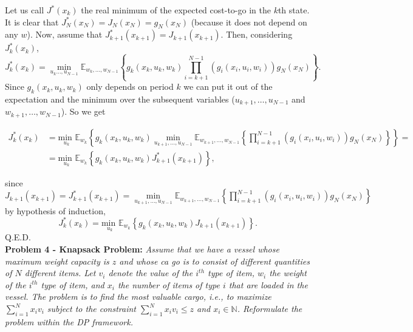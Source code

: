 \documentclass[11pt, english]{article}
\begin{document}
Let us call $J^*(x_k)$ the real minimum of the expected cost-to-go in the $k$th state. It is clear that $J_N^*(x_N)=J_N(x_N)=g_N(x_N)$ (because it does not depend on any $w$). Now, assume that $J_{k+1}^*(x_{k+1})=J_{k+1}(x_{k+1})$. Then, considering $J_k^*(x_k)$,
$$J_k^*(x_k)=\underset{u_{k}\dots, u_{N-1}}{\min}\mathbb{E}_{w_{k},\dots,w_{N-1}}\left\{g_k(x_k,u_k,w_k)\prod\limits_{i=k+1}^{N-1}
\left(g_i(x_i,u_i,w_i)\right)g_N(x_N)\right\}.$$
Since $g_k(x_k,u_k,w_k)$ only depends on period $k$ we can put it out of the expectation and the minimum over the subsequent variables ($u_{k+1},\dots,u_{N-1}$ and $w_{k+1},\dots,w_{N-1}$). So we get

\begin{align*}
	J_k^*(x_k) & =\underset{u_k}{\text{min }}\mathbb{E}_{w_k}\left\{g_k(x_k,u_k,w_k)\underset{u_{k+1},\dots,u_{N-1}}{\min}\mathbb{E}_{w_{k+1},\dots,w_{N-1}}\left\{\prod\limits_{i=k+1}^{N-1}\left(g_i(x_i,u_i,w_i)\right)g_N(x_N)\right\} \right\}=\\
	& =\underset{u_k}{\text{min }}\mathbb{E}_{w_k}\left\{g_k(x_k,u_k,w_k)J_{k+1}^*(x_{k+1})\right\},
\end{align*}
 
since $J_{k+1}(x_{k+1})=J_{k+1}^*(x_{k+1})=\underset{u_{k+1},\dots,u_{N-1}}{\min}\mathbb{E}_{w_{k+1},\dots,w_{N-1}}\left\{\prod\limits_{i=k+1}^{N-1}\left(g_i(x_i,u_i,w_i)\right)g_N(x_N)\right\}$ by hypothesis of induction,
$$J_k^*(x_k)=\underset{u_k}{\text{min }}\mathbb{E}_{w_k}\left\{g_k(x_k,u_k,w_k)J_{k+1}(x_{k+1})\right\}.$$
Q.E.D.\\

\textbf{Problem 4 - Knapsack Problem:} \textit{Assume that we have a vessel whose maximum weight capacity is $z$ and whose ca go is to consist of different quantities of $N$ different items. Let $v_i$ denote the value of the $i^{th}$ type of item, $w_i$ the weight of the $i^{th}$ type of item, and $x_i$ the number of items of type $i$ that are loaded in the vessel. The problem is to find the most valuable cargo, i.e., to maximize $\sum_{i = 1}^N x_i v_i$ subject to the constraint $\sum_{i = 1}^N x_i v_i \leq z$ and $x_i \in \mathbb{N}$. Reformulate the problem within the DP framework.}\\
\end{document}
